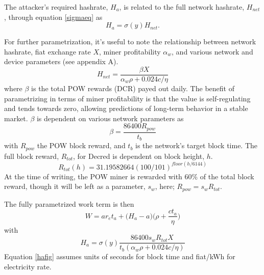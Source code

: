 \documentclass[a4paper,12pt]{article}
\begin{document}
The attacker's required hashrate, $ H_a $, is related to the full network hashrate,  $H_{net}$, through equation \ref{sigmaeq} as 
%
\begin{equation}
H_a = \sigma(y)H_{net}.
\end{equation}
 

For further parametrization, it's useful to note the relationship between network hashrate, fiat exchange rate $ X $, miner profitability $ \alpha_w $, and various network and device parameters (see appendix A).
%
\begin{equation}
H_{net} = \frac{ \beta X }{ \alpha_w \rho + 0.024 c / \eta  }
\end{equation}
%
where $\beta$ is the total POW rewards (DCR) payed out daily. The benefit of parametrizing in terms of miner profitability is that the value is self-regulating and tends towards zero, allowing predictions of long-term behavior in a stable market. $\beta$ is dependent on various network parameters as
%
\begin{equation}
\beta = \frac{ 86400 R_{pow} }{ t_b } 
\end{equation}
%
with $R_{pow}$ the POW block reward, and $t_b$ is the network's target block time. The full block reward, $R_{tot}$, for Decred is dependent on block height, $h$.
%
\begin{equation}
R_{tot}(h) = 31.19582664(100/101)^{floor(h/6144)}
\end{equation}
%
At the time of writing, the POW miner is rewarded with 60\% of the total block reward, though it will be left as a parameter, $ s_w $, here; $R_{pow} = s_w R_{tot}$. 

The fully parametrized work term is then 
%
\begin{equation}
W = ar_et_a +\Big( H_a - a \Big) \Big(\rho + \frac{ c t_a }{ \eta } \Big)
\end{equation}
%
with
%
%
\begin{equation}
\label{hafig}
H_a = \sigma(y) \frac{ 86400 s_w R_{tot} X }{ t_b (\alpha_w \rho + 0.024 c / \eta) }
\end{equation}
%
Equation \ref{hafig} assumes units of seconds for block time and fiat/kWh for electricity rate.
\end{document}
